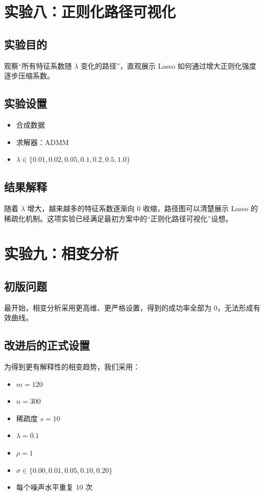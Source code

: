 \documentclass[12pt,a4paper]{ctexart}
\begin{document}
\section{实验八：正则化路径可视化}
\subsection{实验目的}
观察“所有特征系数随 $\lambda$ 变化的路径”，直观展示 Lasso 如何通过增大正则化强度逐步压缩系数。

\subsection{实验设置}
\begin{itemize}[leftmargin=2em]
    \item 合成数据
    \item 求解器：ADMM
    \item $\lambda \in \{0.01, 0.02, 0.05, 0.1, 0.2, 0.5, 1.0\}$
\end{itemize}

\subsection{结果解释}
随着 $\lambda$ 增大，越来越多的特征系数逐渐向 0 收缩，路径图可以清楚展示 Lasso 的稀疏化机制。这项实验已经满足最初方案中的“正则化路径可视化”设想。

\section{实验九：相变分析}
\subsection{初版问题}
最开始，相变分析采用更高维、更严格设置，得到的成功率全部为 0，无法形成有效曲线。

\subsection{改进后的正式设置}
为得到更有解释性的相变趋势，我们采用：
\begin{itemize}[leftmargin=2em]
    \item $m=120$
    \item $n=300$
    \item 稀疏度 $s=10$
    \item $\lambda=0.1$
    \item $\rho=1$
    \item $\sigma \in \{0.00, 0.01, 0.05, 0.10, 0.20\}$
    \item 每个噪声水平重复 10 次
\end{itemize}
\end{document}
